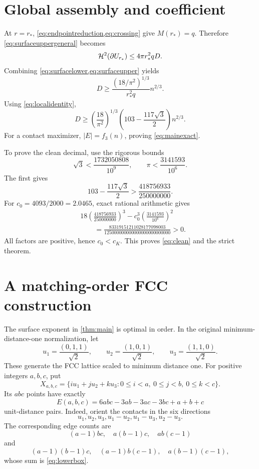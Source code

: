 \section{Global assembly and coefficient}

At $r=r_*$, \cref{eq:endpointreduction,eq:crossing} give
$M(r_*)=q$.  Therefore \cref{eq:surfaceuppergeneral} becomes
\begin{equation}\label{eq:surfaceupper}
 \mathcal H^2(\partial U_{r_*})
 \le4\pi r_*^2qD.
\end{equation}
Combining \cref{eq:surfacelower,eq:surfaceupper} yields
\[
 D\ge
 \frac{(18/\pi^2)^{1/3}}{r_*^2q}n^{2/3}.
\]
Using \cref{eq:localidentity},
\begin{equation}\label{eq:Dexact}
 \boxed{
 D\ge
 \left(\frac{18}{\pi^2}\right)^{1/3}
 \left(103-\frac{117\sqrt3}{2}\right)n^{2/3}.}
\end{equation}
For a contact maximizer, $|E|=f_3(n)$, proving \cref{eq:mainexact}.

To prove the clean decimal, use the rigorous bounds
\[
 \sqrt3<\frac{1732050808}{10^9},
 \qquad
 \pi<\frac{3141593}{10^6}.
\]
The first gives
\[
 103-\frac{117\sqrt3}{2}
 >\frac{418756933}{250000000}.
\]
For $c_0=4093/2000=2.0465$, exact rational arithmetic gives
\begin{align*}
&18\left(\frac{418756933}{250000000}\right)^3
-c_0^3\left(\frac{3141593}{10^6}\right)^2\\
&\qquad=
\frac{83319151211028177098003}
{125000000000000000000000000}>0.
\end{align*}
All factors are positive, hence $c_0<c_K$.  This proves \cref{eq:clean} and the
strict theorem.

\section{A matching-order FCC construction}
\label{sec:lower}

The surface exponent in \cref{thm:main} is optimal in order.  In the original
minimum-distance-one normalization, let
\[
 u_1=\frac{(0,1,1)}{\sqrt2},
 \qquad
 u_2=\frac{(1,0,1)}{\sqrt2},
 \qquad
 u_3=\frac{(1,1,0)}{\sqrt2}.
\]
These generate the FCC lattice scaled to minimum distance one.  For positive
integers $a,b,c$, put
\[
 X_{a,b,c}
 =\{iu_1+ju_2+ku_3:
 0\le i<a,\ 0\le j<b,\ 0\le k<c\}.
\]
Its $abc$ points have exactly
\begin{equation}\label{eq:lowerbox}
 E(a,b,c)
 =6abc-3ab-3ac-3bc+a+b+c
\end{equation}
unit-distance pairs.  Indeed, orient the contacts in the six directions
\[
 u_1,u_2,u_3,u_1-u_2,u_1-u_3,u_2-u_3.
\]
The corresponding edge counts are
\[
 (a-1)bc,\quad a(b-1)c,\quad ab(c-1)
\]
and
\[
 (a-1)(b-1)c,\quad(a-1)b(c-1),\quad a(b-1)(c-1),
\]
whose sum is \cref{eq:lowerbox}.

